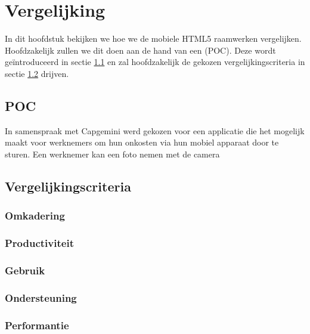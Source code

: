 \chapter{Vergelijking}
\label{chap:vergelijking}

In dit hoofdstuk bekijken we hoe we de mobiele HTML5 raamwerken vergelijken.
Hoofdzakelijk zullen we dit doen aan de hand van een  (POC).
Deze wordt geïntroduceerd in sectie \ref{sec:vergelijking-poc} en zal hoofdzakelijk de gekozen vergelijkingscriteria in sectie \ref{sec:vergelijking-criteria} drijven.


\section{POC} %
\label{sec:vergelijking-poc}
In samenspraak met Capgemini werd gekozen voor een applicatie die het mogelijk maakt voor werknemers om hun onkosten via hun mobiel apparaat door te sturen.
Een werknemer kan een foto nemen met de camera 

\section{Vergelijkingscriteria} %
\label{sec:vergelijking-criteria}

\subsection{Omkadering}
\subsection{Productiviteit}
\subsection{Gebruik}
\subsection{Ondersteuning}
\subsection{Performantie}